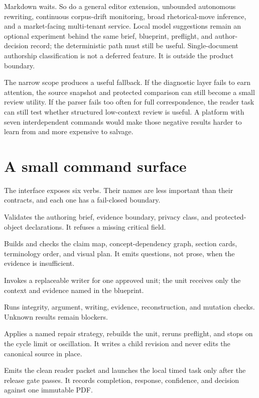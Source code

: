 Markdown waits. So do a general editor extension, unbounded autonomous rewriting,
continuous corpus-drift monitoring, broad rhetorical-move inference, and a
market-facing multi-tenant service. Local model suggestions remain an optional
experiment behind the same brief, blueprint, preflight, and author-decision
record; the deterministic path must still be useful. Single-document
authorship classification is not a deferred feature. It is outside the product
boundary.

The narrow scope produces a useful fallback. If the diagnostic layer fails to
earn attention, the source snapshot and protected comparison can still become a
small review utility. If the parser fails too often for full correspondence,
the reader task can still test whether structured low-context review is useful.
A platform with seven interdependent commands would make those negative results
harder to learn from and more expensive to salvage.

\section{A small command surface}

The interface exposes six verbs. Their names are less important than their
contracts, and each one has a fail-closed boundary.

\begin{description}[style=nextline,leftmargin=28mm,labelindent=0mm]
\item[\texttt{hv init}] Validates the authoring brief, evidence boundary,
privacy class, and protected-object declarations. It refuses a missing critical
field.
\item[\texttt{hv plan}] Builds and checks the claim map, concept-dependency
graph, section cards, terminology order, and visual plan. It emits questions,
not prose, when the evidence is insufficient.
\item[\texttt{hv draft}] Invokes a replaceable writer for one approved unit; the
unit receives only the context and evidence named in the blueprint.
\item[\texttt{hv preflight}] Runs integrity, argument, writing, evidence,
reconstruction, and mutation checks. Unknown results remain blockers.
\item[\texttt{hv repair}] Applies a named repair strategy, rebuilds the unit,
reruns preflight, and stops on the cycle limit or oscillation. It writes a
child revision and never edits the canonical source in place.
\item[\texttt{hv release}] Emits the clean reader packet and launches the local
timed task only after the release gate passes. It records completion, response,
confidence, and decision against one immutable PDF.
\end{description}

